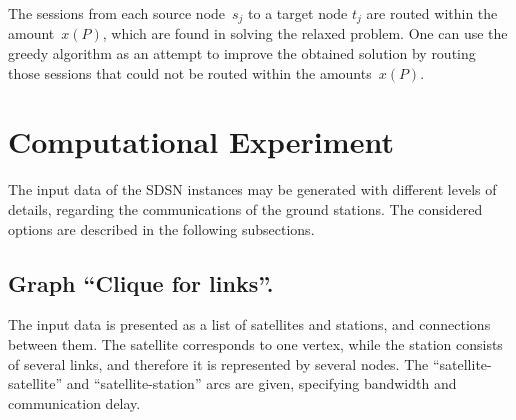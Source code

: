 \documentclass{ifacconf}
\begin{document}


The sessions from each source node~$s_j$ to a target node $t_j$ are routed within
the amount~$x(P)$, which are found in solving the relaxed problem. One can use the greedy algorithm as an attempt to improve the obtained solution by routing those sessions that could not be routed within the amounts~$x(P)$.



\section{Computational Experiment}


The input data of the SDSN instances may be generated with different levels of details, regarding the communications of the ground stations.
The considered options are described in the following subsections. 

\subsection{ Graph ``Clique for links''.}
\label{subsec:initialclique}

The input data is presented as a list of satellites and stations, and
connections between them. The satellite corresponds to one vertex, while the station consists of several links, and therefore
it is represented by several nodes.
The ``satellite-satellite'' and ``satellite-station'' arcs are given, specifying
bandwidth and communication delay.
\end{document}
